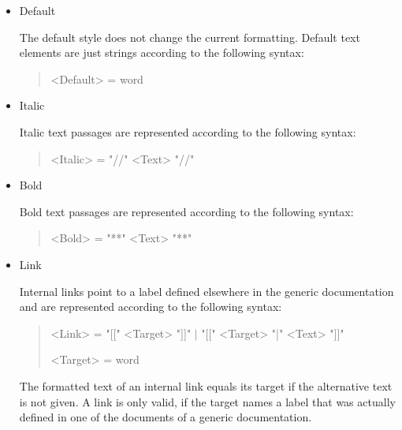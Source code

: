 \begin{itemize}

\item Default\nopagebreak

The default style does not change the current formatting.
Default text elements are just strings according to the following syntax:

\begin{quote}\begin{grammar}
<Default> = word \par
\end{grammar}\end{quote}

\item Italic\nopagebreak

Italic text passages are represented according to the following syntax:

\begin{quote}\begin{grammar}
<Italic> = "//" <Text> "//" \par
\end{grammar}\end{quote}

\item Bold\nopagebreak

Bold text passages are represented according to the following syntax:

\begin{quote}\begin{grammar}
<Bold> = "**" <Text> "**" \par
\end{grammar}\end{quote}

\item Link\nopagebreak

Internal links point to a label defined elsewhere in the generic documentation and are represented according to the following syntax:

\begin{quote}\begin{grammar}
<Link> = "[[" <Target> "]]" $\mid$ "[[" <Target> "|" <Text> "]]" \par
<Target> = word \par
\end{grammar}\end{quote}

The formatted text of an internal link equals its target if the alternative text is not given.
A link is only valid, if the target names a label that was actually defined in one of the documents of a generic documentation.


\end{itemize}

